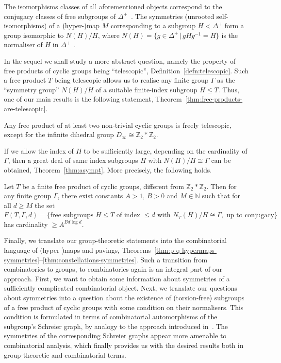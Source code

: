 \documentclass[ALCO,ThmDefs,Unicode,epreuves]{cedram}
\newcommand{\ZZ}{\mathbb{Z}}
\newcommand{\NN}{\mathbb{N}}
\begin{document}
The isomorphisms classes of all aforementioned objects correspond to the conjugacy classes of free subgroups of $\Delta^+$~\cite[Theorem~3.7]{JoSi}. The symmetries (\ie unrooted self-isomorphisms) of a (hyper-)map $M$ corresponding to a subgroup $H < \Delta^+$ form a group isomorphic to $N(H)/H$, where $N(H) = \{ g \in \Delta^+ \, | \, g H g^{-1} = H \}$ is the normaliser of $H$ in $\Delta^+$~\cite[Theorem~3.8]{JoSi}.

In the sequel we shall study a more abstract question, namely the property of free products of cyclic groups being ``telescopic'', %
\cf Definition~\ref{defn:telescopic}. Such a free product $T$ being telescopic allows us to realise any finite group $\Gamma$ as the ``symmetry group'' $N(H)/H$ of a suitable finite-index subgroup $H \leq T$. Thus, one of our main results is the following statement, %
\cf Theorem~\ref{thm:free-products-are-telescopic}.

\begin{theo*}
Any free product of at least two non-trivial cyclic groups is freely telescopic, except for the infinite dihedral group $D_\infty \cong \ZZ_2*\ZZ_2$.
\end{theo*}

If we allow the index of $H$ to be sufficiently large, depending on the cardinality of $\Gamma$, then a great deal of same index subgroups $H$ with $N(H)/H \cong \Gamma$ can be obtained, %
\cf Theorem~\ref{thm:asympt}. More precisely, the following holds. 

\begin{theo*}	
Let $T$ be a finite free product of cyclic groups, different from $\ZZ_2*\ZZ_2$. Then for any finite group ${\Gamma}$, there exist constants $A > 1$, $B > 0$ and $M\in\NN$ such that for all $d{\geq}M$ the set $F(T, {\Gamma}, d) = \{\text{free subgroups } H \leq T \text{ of index } \leq d \text{ with } N_T(H)/H\cong {\Gamma}, \text{ up to conjugacy}\}$ has cardinality ${\geq}A^{B d\log d}$.
\end{theo*}

Finally, we translate our group-theoretic statements into the combinatorial language of (hyper-)maps and pavings, %
\cf Theorems~\ref{thm:p-q-hypermaps-symmetries}--\ref{thm:constellations-symmetries}. Such a transition from combinatorics to groups, to combinatorics again is an integral part of our approach. First, we want to obtain some information about symmetries of a sufficiently complicated combinatorial object. Next, we translate our questions about symmetries into a question about the existence of (torsion-free) subgroups of a free product of cyclic groups with some condition on their normalisers. This condition is formulated in terms of combinatorial automorphisms of the subgroup's Schreier graph, by analogy to the approach introduced in~\cite{KM, We}. The symmetries of the corresponding Schreier graphs appear more amenable to combinatorial analysis, which finally provides us with the desired results both in group-theoretic and combinatorial terms. 
\end{document}
